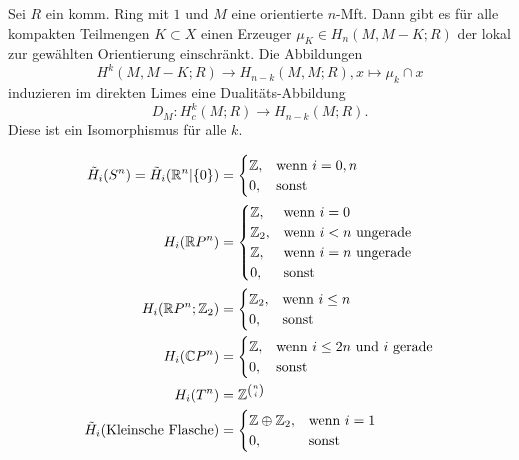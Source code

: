 \documentclass{cheat-sheet}
\newcommand{\RH}{\tilde{H}} %
\newcommand{\ZM}[1]{\Z_{#1}} %
\begin{document}
\begin{satz}
  Sei $R$ ein komm. Ring mit $1$ und $M$ eine orientierte $n$-Mft. Dann gibt es für alle kompakten Teilmengen $K \subset X$ einen Erzeuger $\mu_K \in H_n(M, M-K; R)$ der lokal zur gewählten Orientierung einschränkt. Die Abbildungen
  \[ H^k(M, M - K; R) \to H_{n-k}(M, M; R), x \mapsto \mu_k \cap x \]
  induzieren im direkten Limes eine Dualitäts-Abbildung
  \[ D_M : H^k_c(M; R) \to H_{n-k}(M; R). \]
  Diese ist ein Isomorphismus für alle $k$.
\end{satz}




\begin{bsp}
  \begin{align*}
    \RH_i(S^n) = \RH_i(\R^n|\{0\}) & = \begin{cases}
      \Z, & \text{wenn $i=0,n$} \\
      0, & \text{sonst}
    \end{cases} \\
    H_i(\R P^n) & = \begin{cases}
      \Z, & \text{wenn $i=0$} \\
      \ZM{2}, & \text{wenn $i < n$ ungerade} \\
      \Z, & \text{wenn $i=n$ ungerade} \\
      0, & \text{sonst}
    \end{cases} \\
    H_i(\R P^n; \ZM{2}) & = \begin{cases}
      \ZM{2}, & \text{wenn $i \leq n$} \\
      0, & \text{sonst}
    \end{cases} \\
    H_i(\C P^n) & = \begin{cases}
      \Z, & \text{wenn $i \leq 2n$ und $i$ gerade} \\
      0, & \text{sonst}
    \end{cases} \\
    H_i(T^n) & = \Z^{n \choose i} \\
    \RH_i(\text{Kleinsche Flasche}) & = \begin{cases}
      \Z \oplus \ZM{2}, & \text{wenn $i=1$} \\
      0, & \text{sonst}
    \end{cases}
  \end{align*}
\end{bsp}
\end{document}
